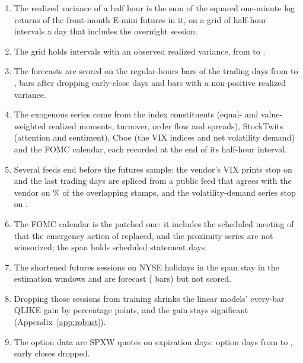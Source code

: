 \begin{enumerate}
\item The realized variance of a half hour is the sum of the squared one-minute log returns of the front-month E-mini
  \SPfh{} futures in it, on a grid of \rhdmNIntervals{} half-hour intervals a day that includes the overnight session.
\item The grid holds \rhdmGridRows{} intervals with an observed realized variance, from  to \rhdsSampleEnd.
\item The forecasts are scored on the \rhorNBars{} regular-hours bars of the \rhorDays{} trading days from
  \rhorSpanStart{} to \rhorSpanEnd, \rhorNIntB{} bars after dropping \rhorEarlyCloses{} early-close days and bars with a
  non-positive realized variance.
\item The exogenous series come from the index constituents (equal- and value-weighted realized moments, turnover,
  order flow and spreads), StockTwits (attention and sentiment), Cboe (the VIX indices and net volatility demand) and
  the FOMC calendar, each recorded at the end of its half-hour interval.
\item Several feeds end before the futures sample: the vendor's VIX prints stop on \rhdsVixVendorLast{} and the last
  \rhdsVixSpliceDays{} trading days are spliced from a public feed that agrees with the vendor on \rhdsVixAgree\% of
  the overlapping stamps, and the volatility-demand series stop on \rhdsVdLast.
\item The FOMC calendar is the patched one: it includes the scheduled meeting of \rhdsFomcSchedMeeting{} that the
  emergency action of \rhdsFomcReplaced{} replaced, and the proximity series are not winsorized; the span holds
  \rhchNEventDays{} scheduled statement days.
\item The \rhholNSessions{} shortened futures sessions on NYSE holidays in the span stay in the estimation windows and
  are forecast (\rhholNBars{} bars) but not scored.
\item Dropping those sessions from training shrinks the linear models' every-bar QLIKE gain by \rhholEffDBBarPpRng{}
  percentage points, and the gain stays significant (Appendix~\ref{app:robust}).
\item The option data are SPXW quotes on expiration days: \rheNdays{} option days from \rheSampleStart{} to
  \rheSampleEnd, early closes dropped.
\end{enumerate}

